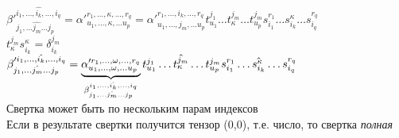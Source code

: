 \documentclass[12pt]{article}
\begin{document}
$\beta'^{i_1, \ldots, \hat{i_k},\ldots, i_q}_{j_1, \ldots \hat{j_m} \ldots j_p} = \alpha'^{r_1,\ldots,\kappa,\ldots,r_q}_{u_1,\ldots,\kappa,\ldots u_p} = \alpha'^{r_1,\ldots,i_k,\ldots,r_q}_{u_1,\ldots,j_m,\ldots u_p}t_{u_1}^{j_1}\ldots t_\kappa^{j_m} \ldots t_{u_p}^{j_m} s_{i_1}^{r_1}\ldots s_{i_k}^\kappa\ldots s_{i_q}^{r_q}$\\
$t_\kappa^{j_m}s_{i_k}^\kappa = \delta_{i_k}^{j_m}$\\
$\beta'^{i_1, \ldots, \hat{i_k},\ldots, i_q}_{j_1, \ldots \hat{j_m} \ldots j_p} = \ub{\beta^{i_1, \ldots, \hat{i_k},\ldots, i_q}_{j_1, \ldots \hat{j_m} \ldots j_p}}{\alpha'^{r_1,\ldots,\omega,\ldots,r_q}_{u_1,\ldots,\omega,\ldots u_p}}t_{u_1}^{j_1}\ldots \hat{t_\kappa^{j_m}} \ldots t_{u_p}^{j_m} s_{i_1}^{r_1}\ldots \hat{s_{i_k}^\kappa}\ldots s_{i_q}^{r_q}$\\
Свертка может быть по нескольким парам индексов\\
Если в результате свертки получится тензор (0,0), т.е. число, то свертка \textit{полная}\\
\end{document}

